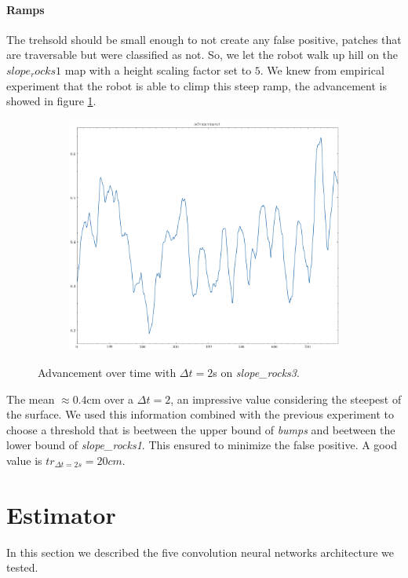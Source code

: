 \documentclass[../document.tex]{subfiles}
\begin{document}
    \paragraph{Ramps}
    The trehsold should be small enough to not create any false positive, patches that are traversable but were classified as not. So, we let the robot walk up hill on the $slope_rocks1$ map with a height scaling factor set to $5$. We knew from empirical experiment that the robot is able to climp this steep ramp, the advancement is showed in figure \ref{fig : krock-ramps-sim}.
    \begin{figure}[htbp]
        \centering
        \begin{subfigure}[b]{0.45\textwidth}
            \includegraphics[width=\linewidth]{../img/3/find_tr/100-slope_rocks1}
        \end{subfigure}
        \caption{Advancement over time with $\Delta t = 2$s on \emph{slope\_rocks3}.}
        \label{fig : krock-ramps-sim}
    \end{figure}
    The mean $\approx 0.4$cm over a $\Delta t =2$, an impressive value considering the steepest of the surface. We used this information combined with the previous experiment to choose a threshold that is beetween the upper bound of \emph{bumps} and beetween the lower bound of \emph{slope\_rocks1}. This ensured to minimize the false positive. A good value is $tr_{\Delta t = 2s} = 20cm$. 
\section{Estimator}
\label{sec: estimator}
In this section we described  the five convolution neural networks architecture we tested.
\end{document}
